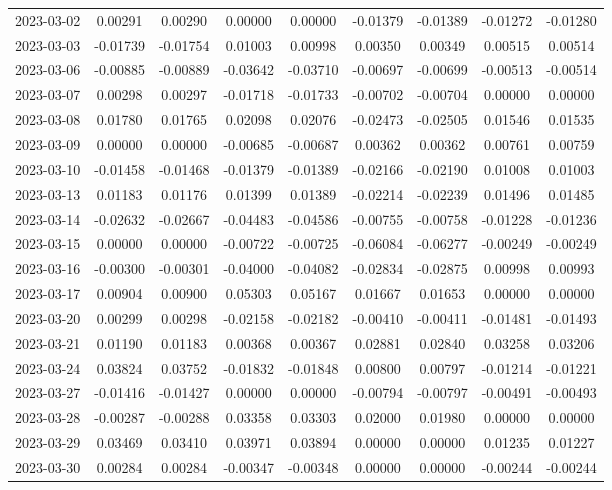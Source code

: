 {\begin{footnotesize}
\begin{longtable}{lcccccccc}
2023-03-02 & 0.00291 & 0.00290 & 0.00000 & 0.00000 & -0.01379 & -0.01389 & -0.01272 & -0.01280 \\
2023-03-03 & -0.01739 & -0.01754 & 0.01003 & 0.00998 & 0.00350 & 0.00349 & 0.00515 & 0.00514 \\
2023-03-06 & -0.00885 & -0.00889 & -0.03642 & -0.03710 & -0.00697 & -0.00699 & -0.00513 & -0.00514 \\
2023-03-07 & 0.00298 & 0.00297 & -0.01718 & -0.01733 & -0.00702 & -0.00704 & 0.00000 & 0.00000 \\
2023-03-08 & 0.01780 & 0.01765 & 0.02098 & 0.02076 & -0.02473 & -0.02505 & 0.01546 & 0.01535 \\
2023-03-09 & 0.00000 & 0.00000 & -0.00685 & -0.00687 & 0.00362 & 0.00362 & 0.00761 & 0.00759 \\
2023-03-10 & -0.01458 & -0.01468 & -0.01379 & -0.01389 & -0.02166 & -0.02190 & 0.01008 & 0.01003 \\
2023-03-13 & 0.01183 & 0.01176 & 0.01399 & 0.01389 & -0.02214 & -0.02239 & 0.01496 & 0.01485 \\
2023-03-14 & -0.02632 & -0.02667 & -0.04483 & -0.04586 & -0.00755 & -0.00758 & -0.01228 & -0.01236 \\
2023-03-15 & 0.00000 & 0.00000 & -0.00722 & -0.00725 & -0.06084 & -0.06277 & -0.00249 & -0.00249 \\
2023-03-16 & -0.00300 & -0.00301 & -0.04000 & -0.04082 & -0.02834 & -0.02875 & 0.00998 & 0.00993 \\
2023-03-17 & 0.00904 & 0.00900 & 0.05303 & 0.05167 & 0.01667 & 0.01653 & 0.00000 & 0.00000 \\
2023-03-20 & 0.00299 & 0.00298 & -0.02158 & -0.02182 & -0.00410 & -0.00411 & -0.01481 & -0.01493 \\
2023-03-21 & 0.01190 & 0.01183 & 0.00368 & 0.00367 & 0.02881 & 0.02840 & 0.03258 & 0.03206 \\
2023-03-24 & 0.03824 & 0.03752 & -0.01832 & -0.01848 & 0.00800 & 0.00797 & -0.01214 & -0.01221 \\
2023-03-27 & -0.01416 & -0.01427 & 0.00000 & 0.00000 & -0.00794 & -0.00797 & -0.00491 & -0.00493 \\
2023-03-28 & -0.00287 & -0.00288 & 0.03358 & 0.03303 & 0.02000 & 0.01980 & 0.00000 & 0.00000 \\
2023-03-29 & 0.03469 & 0.03410 & 0.03971 & 0.03894 & 0.00000 & 0.00000 & 0.01235 & 0.01227 \\
2023-03-30 & 0.00284 & 0.00284 & -0.00347 & -0.00348 & 0.00000 & 0.00000 & -0.00244 & -0.00244 \\

\end{longtable}
\end{footnotesize}}

